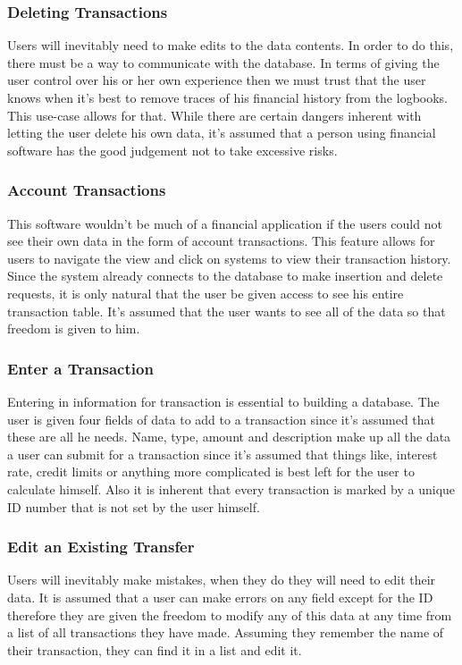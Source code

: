 \documentclass{article}
\begin{document}
\subsubsection{Deleting Transactions}
	Users will inevitably need to make edits to the data contents. In order to do this, there must be a way to communicate with the database. In terms of giving the user control over his or her own experience then we must trust that the user knows when it's best to remove traces of his financial history from the logbooks. This use-case allows for that. While there are certain dangers inherent with letting the user delete his own data, it's assumed that a person using financial software has the good judgement not to take excessive risks.
\subsubsection{Account Transactions}
	This software wouldn't be much of a financial application if the users could not see their own data in the form of account transactions. This feature allows for users to navigate the view and click on systems to view their transaction history. Since the system already connects to the database to make insertion and delete requests, it is only natural that the user be given access to see his entire transaction table. It's assumed that the user wants to see all of the data so that freedom is given to him.
\subsubsection{Enter a Transaction}
	Entering in information for transaction is essential to building a database. The user is given four fields of data to add to a transaction since it's assumed that these are all he needs. Name, type, amount and description make up all the data a user can submit for a transaction since it's assumed that things like, interest rate, credit limits or anything more complicated is best left for the user to calculate himself. Also it is inherent that every transaction is marked by a unique ID number that is not set by the user himself.
\subsubsection{Edit an Existing Transfer}
	Users will inevitably make mistakes, when they do they will need to edit their data. It is assumed that a user can make errors on any field except for the ID therefore they are given the freedom to modify any of this data at any time from a list of all transactions they have made. Assuming they remember the name of their transaction, they can find it in a list and edit it. 
\end{document}
